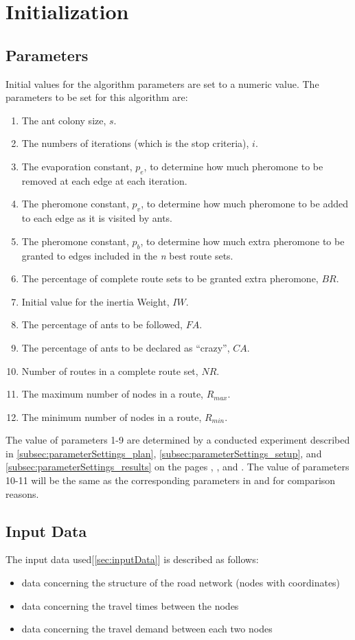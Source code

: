 \section{Initialization}
\subsection{Parameters}
Initial values for the algorithm parameters are set to a numeric value. The parameters to be set for this algorithm are:
\begin{enumerate}
\item The ant colony size, $s$. 
\item The numbers of iterations (which is the stop criteria), $i$.
\item The evaporation constant, $p_e$, to determine how much pheromone to be removed at each edge at each iteration.
\item The pheromone constant, $p_v$, to determine how much pheromone to be added to each edge as it is visited by ants.
\item The pheromone constant, $p_b$, to determine how much extra pheromone to be granted to edges included in the \textit{n} best route sets.
\item The percentage of complete route sets to be granted extra pheromone, $BR$.
\item Initial value for the inertia Weight, $IW$.
\item The percentage of ants to be followed, $FA$.
\item The percentage of ants to be declared as ``crazy'', $CA$.
\item Number of routes in a complete route set, $NR$. 
\item The maximum number of nodes in a route, $R_{max}$.
\item The minimum number of nodes in a route, $R_{min}$.
\end{enumerate}
The value of parameters 1-9 are determined by a conducted experiment described in \ref{subsec:parameterSettings_plan}, \ref{subsec:parameterSettings_setup}, and \ref{subsec:parameterSettings_results} on the pages \pageref{subsec:parameterSettings_plan}, \pageref{subsec:parameterSettings_setup}, and \pageref{subsec:parameterSettings_results}. The value of parameters 10-11 will be the same as the corresponding parameters in \citet{kechagiopoulos14} and \citet{nikolic14} for comparison reasons. 

\subsection{Input Data}
The input data used[\ref{sec:inputData}] is described as follows:
\begin{itemize}
\item data concerning the structure of the road network (nodes with coordinates)
\item data concerning the travel times between the nodes 
\item data concerning the travel demand between each two nodes
\end{itemize}

